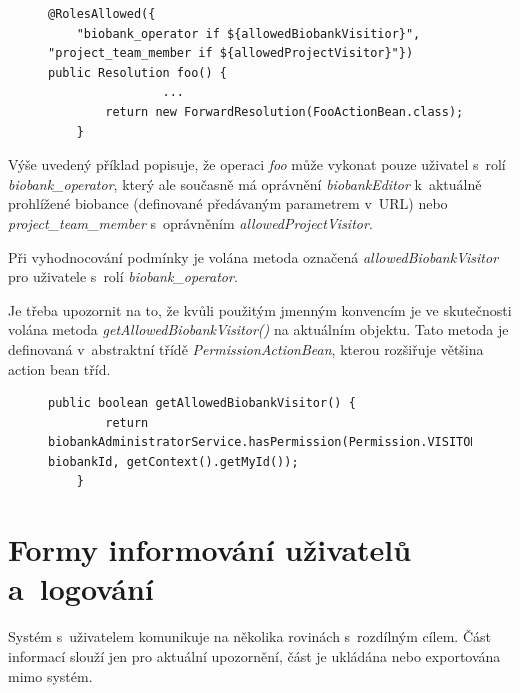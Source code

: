 \documentclass[11pt, final, oneside]{fithesis2}
\begin{document}
\begin{figure}[h!]
\begin{center}
\begin{lstlisting}[mathescape=false]
@RolesAllowed({
	"biobank_operator if ${allowedBiobankVisitior}", "project_team_member if ${allowedProjectVisitor}"})
public Resolution foo() { 
				...
        return new ForwardResolution(FooActionBean.class);
    }
\end{lstlisting}
\end{center}
\end{figure}

Výše uvedený příklad popisuje, že operaci \textit{foo} může vykonat pouze uživatel s~rolí \textit{biobank\_operator}, který ale současně má oprávnění \textit{biobankEditor} k~aktuálně prohlížené biobance (definované předávaným parametrem v~URL) nebo \textit{project\_team\_member} s~oprávněním \textit{allowedProjectVisitor}.

Při vyhodnocování podmínky je volána metoda označená \textit{allowedBiobankVisitor} pro uživatele s~rolí \textit{biobank\_operator}. 

Je třeba upozornit na to, že kvůli použitým jmenným konvencím je ve skutečnosti volána metoda \textit{getAllowedBiobankVisitor()} na aktuálním objektu. Tato metoda je definovaná v~abstraktní třídě \textit{PermissionActionBean}, kterou rozšiřuje většina action bean tříd.

\begin{figure}[h!]
\begin{center}
\begin{lstlisting}
public boolean getAllowedBiobankVisitor() {
        return biobankAdministratorService.hasPermission(Permission.VISITOR, biobankId, getContext().getMyId());
    }
\end{lstlisting}
\end{center}
\end{figure}

\section{Formy informování uživatelů a~logování}
Systém s~uživatelem komunikuje na několika rovinách s~rozdílným cílem. Část informací slouží jen pro aktuální upozornění, část je ukládána nebo exportována mimo systém.
\end{document}

